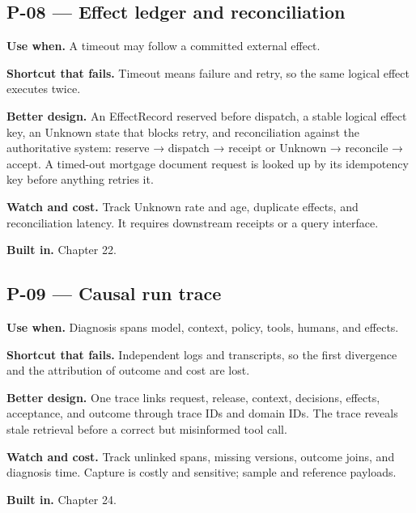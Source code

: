 \subsection{P-08 — Effect ledger and reconciliation}

\textbf{Use when.} A timeout may follow a committed external effect.\par

\textbf{Shortcut that fails.} Timeout means failure and retry, so the same logical effect executes twice.\par

\textbf{Better design.} An EffectRecord reserved before dispatch, a stable logical effect key, an Unknown state that blocks retry, and reconciliation against the authoritative system: reserve → dispatch → receipt or Unknown → reconcile → accept. A timed-out mortgage document request is looked up by its idempotency key before anything retries it.\par

\textbf{Watch and cost.} Track Unknown rate and age, duplicate effects, and reconciliation latency. It requires downstream receipts or a query interface.\par

\textbf{Built in.} Chapter 22.\par

\subsection{P-09 — Causal run trace}

\textbf{Use when.} Diagnosis spans model, context, policy, tools, humans, and effects.\par

\textbf{Shortcut that fails.} Independent logs and transcripts, so the first divergence and the attribution of outcome and cost are lost.\par

\textbf{Better design.} One trace links request, release, context, decisions, effects, acceptance, and outcome through trace IDs and domain IDs. The trace reveals stale retrieval before a correct but misinformed tool call.\par

\textbf{Watch and cost.} Track unlinked spans, missing versions, outcome joins, and diagnosis time. Capture is costly and sensitive; sample and reference payloads.\par

\textbf{Built in.} Chapter 24.\par

